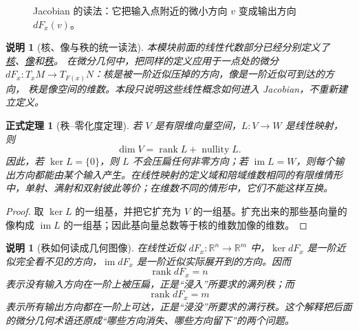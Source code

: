 \documentclass[UTF8,fontset=none,a4paper,11pt]{ctexart}
\theoremstyle{foundation-definition}
\theoremstyle{foundation-theorem}
\newtheorem{theorem}[definition]{正式定理}
\theoremstyle{foundation-proposition}
\theoremstyle{foundation-example}
\theoremstyle{foundation-remark}
\newtheorem{remark}[definition]{说明}
\theoremstyle{foundation-theorem}
\newcommand{\term}[2]{\hyperref[#1]{#2}}
\begin{document}
\begin{figure}[htbp]
\centering
{}
\caption{Jacobian 的读法：它把输入点附近的微小方向 \(v\) 变成输出方向 \(dF_x(v)\)。}
\label{fig:jacobian-map}
\end{figure}

\begin{remark}[核、像与秩的统一读法]\label{rem:kernel-image-rank-recall}
本模块前面的线性代数部分已经分别定义了
\term{def:linear-kernel}{核}、\term{def:linear-image}{像}和\term{def:linear-rank}{秩}。
在微分几何中，把同样的定义应用于一点处的微分
\(dF_x:T_xM\to T_{F(x)}N\)：核是被一阶近似压掉的方向，像是一阶近似可到达的方向，
秩是像空间的维数。本段只说明这些线性概念如何进入 Jacobian，不重新建立定义。
\end{remark}

\begin{theorem}[秩--零化度定理]
若 \(V\) 是有限维向量空间，\(L:V\to W\) 是线性映射，则
\[
\dim V=\operatorname{rank}L+\operatorname{nullity}L.
\]
因此，若 \(\ker L=\{0\}\)，则 \(L\) 不会压扁任何非零方向；若 \(\operatorname{im}L=W\)，则每个输出方向都能由某个输入产生。在线性映射的定义域和陪域维数相同的有限维情形中，单射、满射和双射彼此等价；在维数不同的情形中，它们不能这样互换。
\end{theorem}

\begin{proof}
取 \(\ker L\) 的一组基，并把它扩充为 \(V\) 的一组基。扩充出来的那些基向量的像构成 \(\operatorname{im}L\) 的一组基；因此基向量总数等于核的维数加像的维数。
\end{proof}

\begin{remark}[秩如何读成几何图像]
在线性近似 \(dF_x:\mathbb R^n\to\mathbb R^m\) 中，\(\ker dF_x\) 是一阶近似完全看不见的方向，\(\operatorname{im}dF_x\) 是一阶近似实际展开到的方向。因而
\[
\operatorname{rank}dF_x=n
\]
表示没有输入方向在一阶上被压扁，正是“浸入”所要求的满列秩；而
\[
\operatorname{rank}dF_x=m
\]
表示所有输出方向都在一阶上可达，正是“浸没”所要求的满行秩。这个解释把后面的微分几何术语还原成“哪些方向消失、哪些方向留下”的两个问题。
\end{remark}
\end{document}
